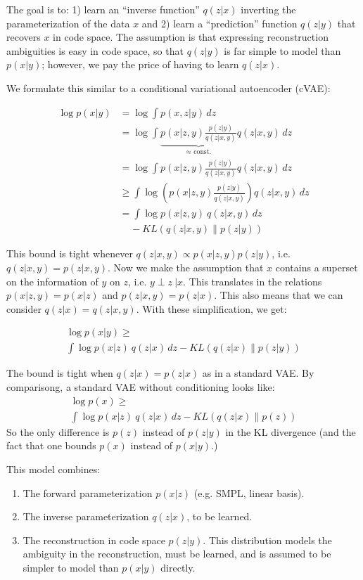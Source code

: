The goal is to: 1) learn an ``inverse function'' $q(z|x)$ inverting the parameterization of the data $x$ and 2) learn a ``prediction'' function $q(z|y)$ that recovers $x$ in code space.
The assumption is that expressing reconstruction ambiguities is easy in code space, so that $q(z|y)$ is far simple to model than $p(x|y)$; however, we pay the price of having to learn $q(z|x)$.

We formulate this similar to a conditional variational autoencoder (cVAE):

$$
\begin{aligned}
\log p(x|y)
&= \log \int p(x,z|y) \,dz \\
&= \log \int \underbrace{p(x|z,y) \frac{p(z|y)}{q(z|x,y)}}_{\text{$\approx$ const.}} q(z|x,y) \,dz \\
&= \log \int p(x|z,y) \frac{p(z|y)}{q(z|x,y)} q(z|x,y) \,dz \\
&\geq \int \log \left(p(x|z,y) \frac{p(z|y)}{q(z|x,y)}\right) q(z|x,y) \,dz \\
&=\int \log p(x|z,y) ~q(z|x,y) \,dz \\
&~~~~~- KL\left(q(z|x,y) \| p(z|y)\right)
\end{aligned}
$$

This bound is tight whenever $q(z|x,y) \propto p(x|z,y) p(z|y)$, i.e. $q(z|x,y) = p(z|x,y)$.
Now we make the assumption that $x$ contains a superset on the information of $y$ on $z$, i.e. $y \perp z ~| x$.
This translates in the relations $p(x|z,y) = p(x|z)$ and $p(z|x,y) = p(z|x)$.
This also means that we can consider $q(z|x) = q(z|x,y)$.
With these simplification, we get:

\begin{multline}
  \log p(x|y) \geq \\
\int \log p(x|z) ~q(z|x) \,dz - KL\left(q(z|x) \| p(z|y)\right)
\end{multline}

The bound is tight when $q(z|x) = p(z|x)$ as in a standard VAE.
By comparisong, a standard VAE without conditioning looks like:
\begin{multline}
  \log p(x) \geq \\
\int \log p(x|z) ~q(z|x) \,dz - KL\left(q(z|x) \| p(z)\right)
\end{multline}
So the only difference is $p(z)$ instead of $p(z|y)$ in the KL divergence (and the fact that one bounds $p(x)$ instead of $p(x|y)$.)

This model combines:
\begin{enumerate}
  \item The forward parameterization $p(x|z)$ (e.g. SMPL, linear basis).
  \item The inverse parameterization $q(z|x)$, to be learned.
  \item The reconstruction in code space $p(z|y)$. This distribution models the ambiguity in the reconstruction, must be learned, and is assumed to be simpler to model than $p(x|y)$ directly.
\end{enumerate}


